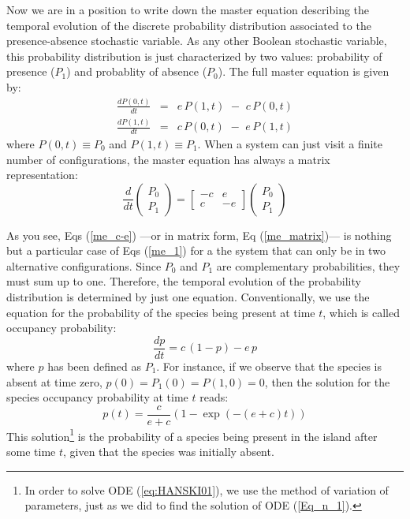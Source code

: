 Now we are in a position to write down the master equation describing the temporal evolution of the discrete probability distribution associated to the presence-absence stochastic variable. As any other Boolean stochastic variable, this probability distribution is just characterized by two values: probability of presence ($P_1$) and probablity of absence ($P_0$). The full master equation is given by:
\begin{eqnarray}
\frac{dP(0,t)}{dt} &=&    e\, P(1,t) \,\, - \,\, c\, P(0,t)  \nonumber \\
\frac{dP(1,t)}{dt} &=&    c\, P(0,t) \,\, - \,\, e\, P(1,t)  
\label{me_c-e}
\end{eqnarray}
where $P(0,t) \equiv P_0$ and $P(1,t) \equiv P_1$. When a system can just visit a finite number of configurations, the master equation has always a matrix representation: 
\begin{equation}
\label{me_matrix}
\frac{d}{dt}\left(
\begin{array}{c}
P_0 \\ 
P_1 
\end{array}
\right) = \left[\begin{array}{cc}
-c &  e \\
 c & -e 
 \end{array} 
\right]
\left(
\begin{array}{c}
P_0 \\ 
P_1 
\end{array}
\right)
\end{equation}

As you see, Eqs (\ref{me_c-e}) ---or in matrix form, Eq (\ref{me_matrix})--- is nothing but a particular case of Eqs (\ref{me_1}) for a the system that can only be in two alternative configurations. Since $P_0$ and $P_1$ are complementary probabilities, they must sum up to one. Therefore, the temporal evolution of the probability distribution is determined by just one equation. Conventionally, we use the equation for the probability of the species being present at time $t$, which is called occupancy probability:
\begin{equation}
\frac{dp}{dt} = c\,(1-p) - e\,p
\label{eq:HANSKI01}
\end{equation}
where $p$ has been defined as $P_1$. For instance, if we observe that the species is absent at time zero, $p(0) = P_1(0) = P(1,0) = 0$, then the solution for the species occupancy probability at time $t$ reads:
\begin{equation}
\label{t_10}
p(t) = \frac{c}{e+c} ( 1 - \exp(-(e+c)t ))
\end{equation}
This solution\footnote{In order to solve ODE (\ref{eq:HANSKI01}), we use the method of variation of parameters, just as we did to find the solution of ODE (\ref{Eq_n_1}).} is the probability of a species being present in the island after some time $t$, given that the species was initially absent. 
\smallskip

